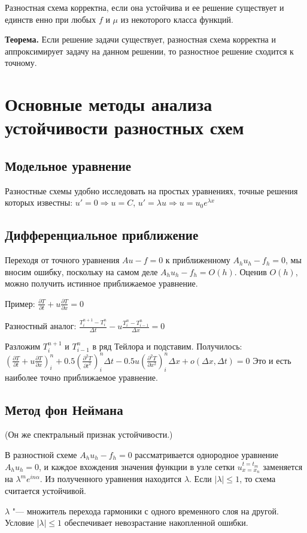 \documentclass[a4paper,12pt]{article}
\begin{document}
Разностная схема корректна, если она устойчива и ее решение существует
и единств
енно при любых $f$ и $\mu$ из некоторого класса функций.

\textbf{Теорема.} Если решение задачи существует, разностная схема
корректна и аппроксимирует задачу на данном решении, то
разностное решение сходится к точному.


\section{Основные методы анализа устойчивости разностных схем}

\subsection{Модельное уравнение}

Разностные схемы удобно исследовать на простых уравнениях,
точные решения которых известны:
$u'=0\Rightarrow u=C$, $u'=\lambda u\Rightarrow u=u_0e^{\lambda x}$


\subsection{Дифференциальное приближение}

Переходя от точного уравнения $Au-f=0$ к приближенному $A_hu_h-f_h=0$,
мы вносим ошибку, поскольку на самом деле $A_hu_h-f_h=O(h)$.
Оценив $O(h)$, можно получить истинное приближаемое уравнение.

Пример:
$\frac{\partial T}{\partial t}+u\frac{\partial T}{\partial x}=0$

Разностный аналог:
$\frac{T_i^{n+1}-T_i^n}{\Delta t}-u\frac{T_i^n-T_{i-1}^n}{\Delta x}=0$

Разложим $T_i^{n+1}$ и $T_{i-1}^n$ в ряд Тейлора и подставим.
Получилось:
$(\frac{\partial T}{\partial t}+u\frac{\partial T}{\partial x})_i^n
	+0.5(\frac{\partial^2T}{\partial t^2})_i^n\Delta t
    -0.5u(\frac{\partial^2T}{\partial x^2})_i^n\Delta x
    +o(\Delta x,\Delta t)=0$
Это и есть наиболее точно приближаемое уравнение.


\subsection{Метод фон Неймана}

(Он же спектральный признак устойчивости.)

В разностной схеме $A_hu_h-f_h=0$ рассматривается однородное
уравнение $A_hu_h=0$, и каждое вхождения значения функции
в узле сетки $u_{x=x_n}^{t=t_m}$ заменяется на $\lambda^m e^{in\alpha}$.
Из полученного уравнения находится $\lambda$.
Если $|\lambda|\le1$, то схема считается устойчивой.

$\lambda$ "--- множитель перехода гармоники с одного временного
слоя на другой. Условие $|\lambda|\le1$ обеспечивает невозрастание
накопленной ошибки.
\end{document}
